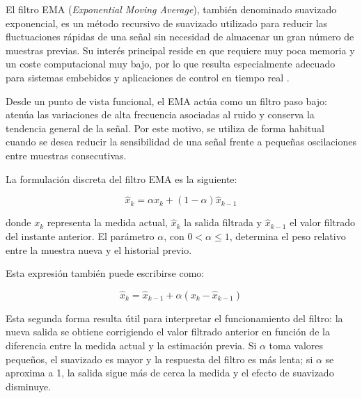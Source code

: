 El filtro EMA (\textit{Exponential Moving Average}), también denominado suavizado exponencial, es un método recursivo de suavizado utilizado para reducir las fluctuaciones rápidas de una señal sin necesidad de almacenar un gran número de muestras previas. Su interés principal reside en que requiere muy poca memoria y un coste computacional muy bajo, por lo que resulta especialmente adecuado para sistemas embebidos y aplicaciones de control en tiempo real \cite{industrialEma, wikipediaSuavizamientoExponencial, mciEma}.

\vspace{0.3cm}

Desde un punto de vista funcional, el EMA actúa como un filtro paso bajo: atenúa las variaciones de alta frecuencia asociadas al ruido y conserva la tendencia general de la señal. Por este motivo, se utiliza de forma habitual cuando se desea reducir la sensibilidad de una señal frente a pequeñas oscilaciones entre muestras consecutivas.

\vspace{0.3cm}

La formulación discreta del filtro EMA es la siguiente:

\vspace{0.3cm}

\begin{equation}
\hat{x}_k = \alpha x_k + (1-\alpha) \hat{x}_{k-1}
\end{equation}

\vspace{0.3cm}

donde $x_k$ representa la medida actual, $\hat{x}_k$ la salida filtrada y $\hat{x}_{k-1}$ el valor filtrado del instante anterior. El parámetro $\alpha$, con $0 < \alpha \leq 1$, determina el peso relativo entre la muestra nueva y el historial previo.

\vspace{0.3cm}

Esta expresión también puede escribirse como:

\vspace{0.3cm}

\begin{equation}
\hat{x}_k = \hat{x}_{k-1} + \alpha \left(x_k - \hat{x}_{k-1}\right)
\end{equation}

\vspace{0.3cm}

Esta segunda forma resulta útil para interpretar el funcionamiento del filtro: la nueva salida se obtiene corrigiendo el valor filtrado anterior en función de la diferencia entre la medida actual y la estimación previa. Si $\alpha$ toma valores pequeños, el suavizado es mayor y la respuesta del filtro es más lenta; si $\alpha$ se aproxima a 1, la salida sigue más de cerca la medida y el efecto de suavizado disminuye.

